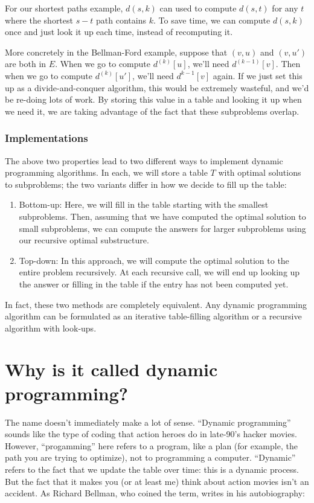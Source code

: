 \documentclass [12pt]{article}
\theoremstyle{definition}
\begin{document}
For our shortest paths example, $d(s, k)$ can used to compute $d(s, t)$ for any $t$ where the shortest $s - t$ path contains $k$. To save time, we can compute $d(s, k)$ once and just look it up each time, instead of recomputing it.

More concretely in the Bellman-Ford example, suppose that $(v, u)$ and $(v, u' )$ are both in $E$. When we go to compute $d^{(k)}[u]$, we'll need $d^{(k-1)}[v ]$. Then when we go to compute $d^{(k)}[u ' ]$, we'll need $d^{k-1}[v ]$ again. If we just set this up as a divide-and-conquer algorithm, this would be extremely wasteful, and we'd be re-doing lots of work. By storing this value in a table and looking it up when we need it, we are taking advantage of the fact that these subproblems overlap.


\subsubsection{Implementations} 

The above two properties lead to two different ways to implement dynamic programming algorithms. In each, we will store a table $T$ with optimal solutions to subproblems; the two variants differ in how we decide to fill up the table: 

\begin{enumerate}
  \item Bottom-up: Here, we will fill in the table starting with the smallest subproblems. Then, assuming that we have computed the optimal solution to small subproblems, we can compute the answers for larger subproblems using our recursive optimal substructure.
  \item Top-down: In this approach, we will compute the optimal solution to the entire problem recursively. At each recursive call, we will end up looking up the answer or filling in the table if the entry has not been computed yet.
\end{enumerate}
In fact, these two methods are completely equivalent. Any dynamic programming algorithm can be formulated as an iterative table-filling algorithm or a recursive algorithm with look-ups.


\section{Why is it called dynamic programming?}

The name doesn't immediately make a lot of sense. ``Dynamic programming'' sounds like the type of coding that action heroes do in late-90's hacker movies. However, ``progamming'' here refers to a program, like a plan (for example, the path you are trying to optimize), not to programming a computer. ``Dynamic'' refers to the fact that we update the table over time: this is a dynamic process. But the fact that it makes you (or at least me) think about action movies isn't an accident. As Richard Bellman, who coined the term, writes in his autobiography:
\end{document}
